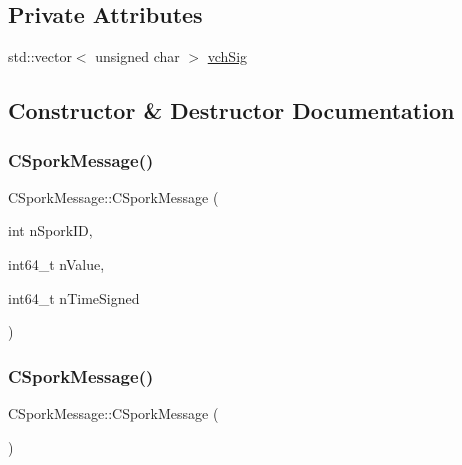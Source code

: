 \subsection*{Private Attributes}
\begin{DoxyCompactItemize}
\item 
std\+::vector$<$ unsigned char $>$ \mbox{\hyperlink{class_c_spork_message_a23740331f22a1ed4a8af5a299a618cc1}{vch\+Sig}}
\end{DoxyCompactItemize}


\subsection{Constructor \& Destructor Documentation}
\mbox{\label{class_c_spork_message_abc84dcd84cc8853a5cebda2a48398b95}} 
\subsubsection{\texorpdfstring{C\+Spork\+Message()}{CSporkMessage()}\hspace{0.1cm}{\footnotesize\ttfamily [1/2]}}
{\footnotesize\ttfamily C\+Spork\+Message\+::\+C\+Spork\+Message (\begin{DoxyParamCaption}\item[{int}]{n\+Spork\+ID,  }\item[{int64\+\_\+t}]{n\+Value,  }\item[{int64\+\_\+t}]{n\+Time\+Signed }\end{DoxyParamCaption})\hspace{0.3cm}{\ttfamily [inline]}}

\mbox{\label{class_c_spork_message_a1b5c7dbbb69725321297410417800c63}} 
\subsubsection{\texorpdfstring{C\+Spork\+Message()}{CSporkMessage()}\hspace{0.1cm}{\footnotesize\ttfamily [2/2]}}
{\footnotesize\ttfamily C\+Spork\+Message\+::\+C\+Spork\+Message (\begin{DoxyParamCaption}{ }\end{DoxyParamCaption})\hspace{0.3cm}{\ttfamily [inline]}}



